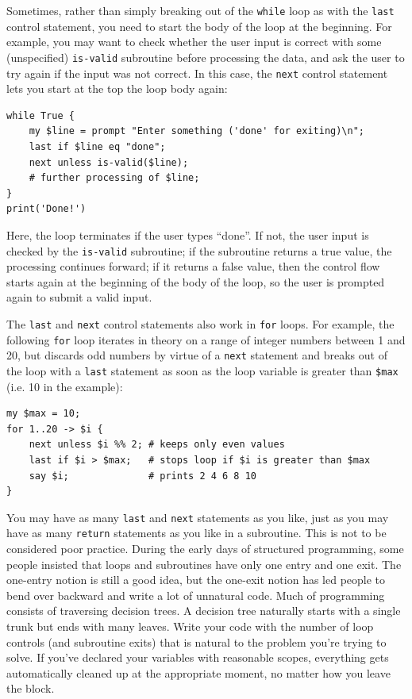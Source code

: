 Sometimes, rather than simply breaking out of the {\tt while}  loop 
as with the {\tt last} control statement, you need to start the 
body of the loop at the beginning. For example, you may want 
to check whether the user input is correct with some 
(unspecified) {\tt is-valid} subroutine before processing 
the data, and ask the user to try again if the input was not 
correct. In this case, the {\tt next} control statement lets 
you start at the top the loop body again:

\begin{verbatim}
while True {
    my $line = prompt "Enter something ('done' for exiting)\n";
    last if $line eq "done";
    next unless is-valid($line);
    # further processing of $line;
}
print('Done!')
\end{verbatim}
%
Here, the loop terminates if the user types ``done''. If not, the user input is checked by the {\tt is-valid} subroutine; if the subroutine returns a true value, the processing continues forward; if it returns a false value, then the control flow starts again at the beginning of the body of the loop, so the user is prompted again to submit a valid input.

The {\tt last} and {\tt next} control statements also work in 
{\tt for} loops. For example, the following {\tt for} loop 
iterates in theory on a range of integer numbers between 1 and 20, 
but discards odd numbers by virtue of a {\tt next} statement 
and breaks out of the loop with a {\tt last} statement as 
soon as the loop variable is greater than {\tt \$max} (i.e. 10 in the example):

\begin{verbatim}
my $max = 10;
for 1..20 -> $i {
    next unless $i %% 2; # keeps only even values
    last if $i > $max;   # stops loop if $i is greater than $max
    say $i;              # prints 2 4 6 8 10
}
\end{verbatim}

You may have as many {\tt last} and {\tt next} statements as you 
like, just as you may have as many {\tt return} statements as 
you like in a subroutine. This is not to be considered poor 
practice. During the early days of structured programming, 
some people insisted that loops and subroutines have only one 
entry and one exit. The one-entry notion is still a good idea, 
but the one-exit notion has led people to bend over backward 
and write a lot of unnatural code. Much of programming consists of traversing 
decision trees. A decision tree naturally starts with a single 
trunk but ends with many leaves. Write your code with the number 
of loop controls (and subroutine exits) that is natural to the 
problem you're trying to solve. If you've declared your variables 
with reasonable scopes, everything gets automatically cleaned up 
at the appropriate moment, no matter how you leave the block.


